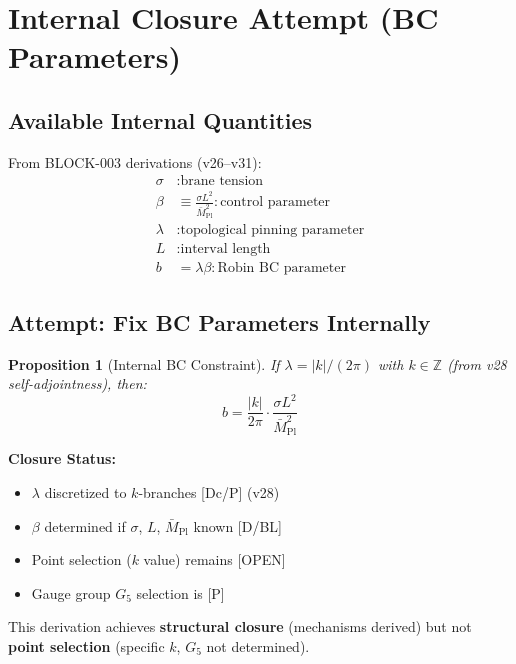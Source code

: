 \documentclass[11pt,a4paper]{article}
\newtheorem{proposition}[theorem]{Proposition}
\begin{document}
\section{Internal Closure Attempt (BC Parameters)}
\label{sec:internal-closure}

\subsection{Available Internal Quantities}

From BLOCK-003 derivations (v26--v31):
\begin{align}
  \sigma &: \text{brane tension}
  \label{eq:sigma-internal} \\
  \beta &\equiv \frac{\sigma L^2}{\bar{M}_{\text{Pl}}^2}: \text{control parameter}
  \label{eq:beta-internal} \\
  \lambda &: \text{topological pinning parameter}
  \label{eq:lambda-internal} \\
  L &: \text{interval length}
  \label{eq:L-internal} \\
  b &= \lambda \beta: \text{Robin BC parameter}
  \label{eq:b-internal}
\end{align}

\subsection{Attempt: Fix BC Parameters Internally}

\begin{proposition}[Internal BC Constraint]
\label{prop:internal-bc}
If $\lambda = |k|/(2\pi)$ with $k \in \mathbb{Z}$ (from v28 self-adjointness), then:
\begin{equation}
  b = \frac{|k|}{2\pi} \cdot \frac{\sigma L^2}{\bar{M}_{\text{Pl}}^2}
  \label{eq:b-from-internal}
\end{equation}
\end{proposition}

\begin{openitembox}
\textbf{Closure Status:}
\begin{itemize}
  \item $\lambda$ discretized to $k$-branches [Dc/P] (v28)
  \item $\beta$ determined if $\sigma$, $L$, $\bar{M}_{\text{Pl}}$ known [D/BL]
  \item Point selection ($k$ value) remains [OPEN]
  \item Gauge group $G_5$ selection is [P]
\end{itemize}
This derivation achieves \textbf{structural closure} (mechanisms derived) but not
\textbf{point selection} (specific $k$, $G_5$ not determined).
\end{openitembox}
\end{document}
